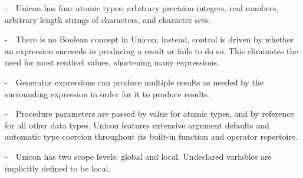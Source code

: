 {}-\ \ Unicon has four atomic types: arbitrary precision integers, real
numbers, arbitrary length strings of characters, and character sets.

{}-\ \ There is no Boolean concept in Unicon; instead, control is driven
by whether an expression succeeds in producing a result or
fails to do so. This eliminates the need for most
sentinel values, shortening many expressions.

{}-\ \ Generator expressions can produce multiple
results as needed by the surrounding expression in order for it to
produce results.

{}-\ \ Procedure parameters are passed by value for atomic types, and by
reference for all other data types. Unicon features extensive argument
defaults and automatic type coercion throughout its built-in function
and operator repertoire.

{}-\ \ Unicon has two scope levels: global and local. Undeclared
variables are implicitly defined to be local.


\bigskip
